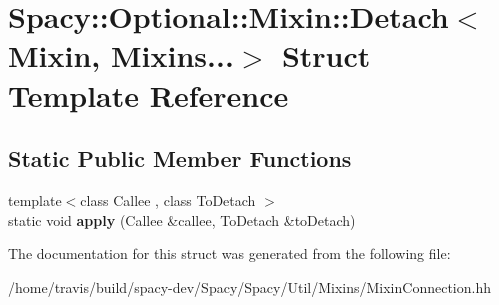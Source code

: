 \hypertarget{structSpacy_1_1Optional_1_1Mixin_1_1Detach_3_01Mixin_00_01Mixins_8_8_8_4}{\section{Spacy\-:\-:Optional\-:\-:Mixin\-:\-:Detach$<$ Mixin, Mixins...$>$ Struct Template Reference}
\label{structSpacy_1_1Optional_1_1Mixin_1_1Detach_3_01Mixin_00_01Mixins_8_8_8_4}
}
\subsection*{Static Public Member Functions}
\begin{DoxyCompactItemize}
\item 
\hypertarget{structSpacy_1_1Optional_1_1Mixin_1_1Detach_3_01Mixin_00_01Mixins_8_8_8_4_a4e59ecaaca0c46c39f3020f0b2c1dc91}{{\footnotesize template$<$class Callee , class To\-Detach $>$ }\\static void {\bfseries apply} (Callee \&callee, To\-Detach \&to\-Detach)}\label{structSpacy_1_1Optional_1_1Mixin_1_1Detach_3_01Mixin_00_01Mixins_8_8_8_4_a4e59ecaaca0c46c39f3020f0b2c1dc91}

\end{DoxyCompactItemize}


The documentation for this struct was generated from the following file\-:\begin{DoxyCompactItemize}
\item 
/home/travis/build/spacy-\/dev/\-Spacy/\-Spacy/\-Util/\-Mixins/Mixin\-Connection.\-hh\end{DoxyCompactItemize}

